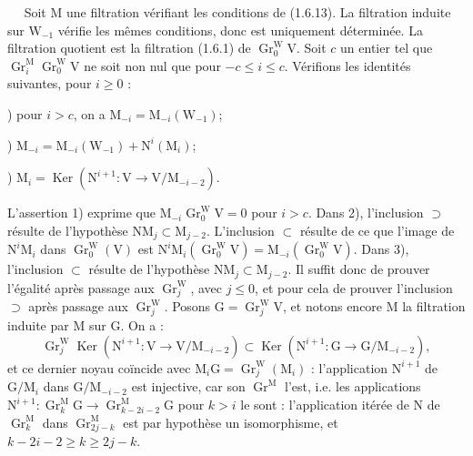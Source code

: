\documentclass[11pt,leqno]{article}
\newcommand{\Page}[1]{\ifvmode\noindent\else\unskip\ \fi{\footnotesize\textcolor{gray}{[p.\,#1]}}\ \ignorespaces}
\begin{document}
\Page{169}
Soit \(\mathrm{M}\) une filtration vérifiant les conditions de (1.6.13). La filtration induite sur \(\mathrm{W}_{-1}\) vérifie les mêmes conditions, donc est uniquement déterminée. La filtration quotient est la filtration (1.6.1) de \(\operatorname{Gr}_0^{\mathrm{W}}\mathrm{V}\). Soit \(c\) un entier tel que \(\operatorname{Gr}_i^{\mathrm{M}}\operatorname{Gr}_0^{\mathrm{W}}\mathrm{V}\) ne soit non nul que pour \(-c\leq i\leq c\). Vérifions les identités suivantes, pour \(i\geq0\) :

) pour \(i>c\), on a \(\mathrm{M}_{-i}=\mathrm{M}_{-i}(\mathrm{W}_{-1})\);

) \(\mathrm{M}_{-i}=\mathrm{M}_{-i}(\mathrm{W}_{-1})+\mathrm{N}^i(\mathrm{M}_i)\);

) \(\mathrm{M}_i=\operatorname{Ker}(\mathrm{N}^{i+1}:\mathrm{V}\to\mathrm{V}/\mathrm{M}_{-i-2})\).

\noindent L’assertion 1) exprime que \(\mathrm{M}_{-i}\operatorname{Gr}_0^{\mathrm{W}}\mathrm{V}=0\) pour \(i>c\). Dans 2), l’inclusion \(\supset\) résulte de l’hypothèse \(\mathrm{N}\mathrm{M}_j\subset\mathrm{M}_{j-2}\). L’inclusion \(\subset\) résulte de ce que l’image de \(\mathrm{N}^i\mathrm{M}_i\) dans \(\operatorname{Gr}_0^{\mathrm{W}}(\mathrm{V})\) est \(\mathrm{N}^i\mathrm{M}_i(\operatorname{Gr}_0^{\mathrm{W}}\mathrm{V})=\mathrm{M}_{-i}(\operatorname{Gr}_0^{\mathrm{W}}\mathrm{V})\). Dans 3), l’inclusion \(\subset\) résulte de l’hypothèse \(\mathrm{N}\mathrm{M}_j\subset\mathrm{M}_{j-2}\). Il suffit donc de prouver l’égalité après passage aux \(\operatorname{Gr}_j^{\mathrm{W}}\), avec \(j\leq0\), et pour cela de prouver l’inclusion \(\supset\) après passage aux \(\operatorname{Gr}_j^{\mathrm{W}}\). Posons \(\mathrm{G}=\operatorname{Gr}_j^{\mathrm{W}}\mathrm{V}\), et notons encore \(\mathrm{M}\) la filtration induite par \(\mathrm{M}\) sur \(\mathrm{G}\). On a :
\[
\operatorname{Gr}_j^{\mathrm{W}}\operatorname{Ker}
(\mathrm{N}^{i+1}:\mathrm{V}\to\mathrm{V}/\mathrm{M}_{-i-2})
\subset
\operatorname{Ker}
(\mathrm{N}^{i+1}:\mathrm{G}\to\mathrm{G}/\mathrm{M}_{-i-2}),
\]
et ce dernier noyau coïncide avec \(\mathrm{M}_i\mathrm{G}=\operatorname{Gr}_j^{\mathrm{W}}(\mathrm{M}_i)\) : l’application \(\mathrm{N}^{i+1}\) de \(\mathrm{G}/\mathrm{M}_i\) dans \(\mathrm{G}/\mathrm{M}_{-i-2}\) est injective, car son \(\operatorname{Gr}^{\mathrm{M}}\) l’est, i.e. les applications \(\mathrm{N}^{i+1}:\operatorname{Gr}_k^{\mathrm{M}}\mathrm{G}\to\operatorname{Gr}_{k-2i-2}^{\mathrm{M}}\mathrm{G}\) pour \(k>i\) le sont : l’application itérée de \(\mathrm{N}\) de \(\operatorname{Gr}_k^{\mathrm{M}}\) dans \(\operatorname{Gr}_{2j-k}^{\mathrm{M}}\) est par hypothèse un isomorphisme, et \(k-2i-2\geq k\geq2j-k\).
\end{document}
